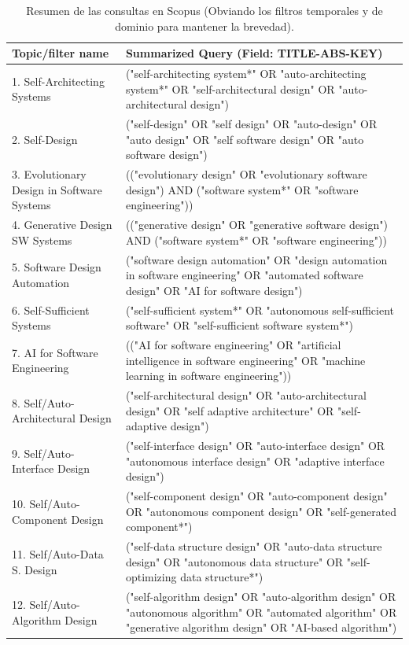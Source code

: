 \documentclass[12pt, letterpaper, oneside]{book}
\begin{document}
  \begin{table}[H]
 	\centering
 	\caption{Resumen de las consultas en Scopus (Obviando los filtros temporales y de dominio para mantener la brevedad).}
 	\label{tab:queries}
 	\begin{tabular}{|@{} p{} | p{} @{}|}
 		\toprule
 		\textbf{Topic/filter name} & \textbf{Summarized Query (Field: TITLE-ABS-KEY)} \\ \midrule
 		1. Self-Architecting Systems & ("self-architecting system*" OR "auto-architecting system*" OR "self-architectural design" OR "auto-architectural design") \\ \hline
 		2. Self-Design & ("self-design" OR "self design" OR "auto-design" OR "auto design" OR "self software design" OR "auto software design") \\ \hline
 		3. Evolutionary Design in Software Systems & (("evolutionary design" OR "evolutionary software design") AND ("software system*" OR "software engineering")) \\ \hline
 		4. Generative Design SW Systems & (("generative design" OR "generative software design") AND ("software system*" OR "software engineering")) \\ \hline
 		5. Software Design Automation & ("software design automation" OR "design automation in software engineering" OR "automated software design" OR "AI for software design") \\ \hline
 		6. Self-Sufficient Systems & ("self-sufficient system*" OR "autonomous self-sufficient software" OR "self-sufficient software system*") \\ \hline
 		7. AI for Software Engineering & (("AI for software engineering" OR "artificial intelligence in software engineering" OR "machine learning in software engineering")) \\ \hline
 		8. Self/Auto-Architectural Design & ("self-architectural design" OR "auto-architectural design" OR "self adaptive architecture" OR "self-adaptive design") \\ \hline
 		9. Self/Auto-Interface Design & ("self-interface design" OR "auto-interface design" OR "autonomous interface design" OR "adaptive interface design") \\ \hline
 		10. Self/Auto-Component Design & ("self-component design" OR "auto-component design" OR "autonomous component design" OR "self-generated component*") \\ \hline
 		11. Self/Auto-Data S. Design & ("self-data structure design" OR "auto-data structure design" OR "autonomous data structure" OR "self-optimizing data structure*") \\ \hline
 		12. Self/Auto-Algorithm Design & ("self-algorithm design" OR "auto-algorithm design" OR "autonomous algorithm" OR "automated algorithm" OR "generative algorithm design" OR "AI-based algorithm") \\ \bottomrule
 	\end{tabular}
 \end{table}
 
\end{document}
